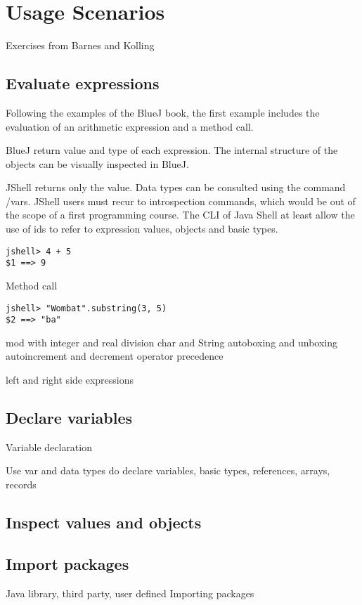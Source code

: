 \documentclass{article}
\begin{document}

\section{Usage Scenarios}

Exercises from Barnes and Kolling

\subsection{Evaluate expressions}

Following the examples of the BlueJ book, the first example includes the evaluation of an arithmetic expression and a method call.

BlueJ return value and type of each expression. 
The internal structure of the objects can be visually inspected in BlueJ. 

JShell returns only the value. Data types can be consulted using the command /vars.
JShell users must recur to introspection commands, which would be out of the scope of a first programming course. 
The CLI of Java Shell at least allow the use of ids to refer to expression values,  objects  and basic types.

\begin{lstlisting}
jshell> 4 + 5
$1 ==> 9
\end{lstlisting}

Method call
\begin{lstlisting}
jshell> "Wombat".substring(3, 5)
$2 ==> "ba"
\end{lstlisting}

mod with %
integer and real division
char and String
autoboxing and unboxing
autoincrement and decrement
operator precedence

left and right side expressions

\subsection{Declare variables}
Variable declaration

Use var and data types do declare variables, basic types, references, arrays, records

\subsection{Inspect values and objects}

\subsection{Import packages}
Java library, third party, user defined
Importing packages
\end{document}

